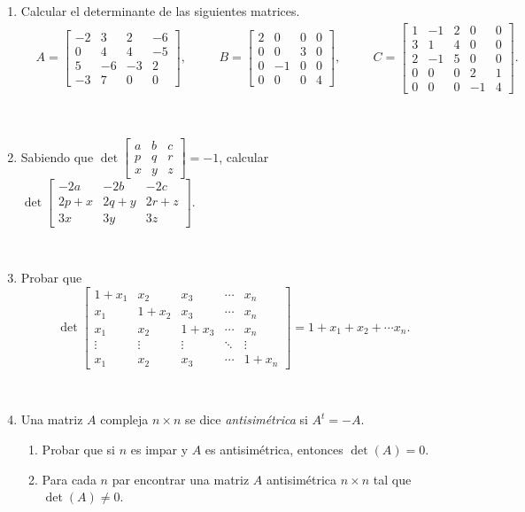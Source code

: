 \documentclass[11pt,spanish,makeidx]{amsbook}
\begin{document}
\begin{enumerate}


		\item Calcular el determinante de las siguientes matrices.
		\begin{align*}
		&A=\begin{bmatrix} -2&3&2&-6\\ 0&4&4&-5\\ 5&-6&-3&2\\ -3&7&0&0 \end{bmatrix},\quad
		&&B=\begin{bmatrix} 2&0&0&0\\ 0&0&3&0\\ 0&-1&0&0\\ 0&0&0&4\end{bmatrix},\quad
		&&C=\begin{bmatrix}
		1&-1&2&0&0\\ 3&1&4&0&0\\ 2&-1&5&0&0 \\0&0&0&2&1\\ 0&0&0&-1&4
		\end{bmatrix}.
		\end{align*}
	
\ 		
		
		\item Sabiendo que
		$
		\det \begin{bmatrix} a&b&c\\ p&q&r\\
		x&y&z\end{bmatrix}=-1
		$,
		calcular
		$
		\det \begin{bmatrix} -2a&-2b&-2c\\ 2p+x&2q+y&2r+z\\
		3x&3y&3z\end{bmatrix}.
		$
	
\ 	
		
		\item
		Probar que
		$$
		\det\begin{bmatrix}
		1+x_1 & x_2 & x_3 & \cdots & x_n \\
		x_1 & 1+x_2 & x_3 & \cdots & x_n \\
		x_1 & x_2 & 1+x_3 & \cdots & x_n \\
		\vdots & \vdots & \vdots &\ddots& \vdots \\
		x_1 & x_2 & x_3 & \cdots & 1+x_n
		\end{bmatrix}
		= 1+x_1+x_2 + \cdots x_n.
		$$
	
\ 
	
		\item
		Una matriz $A$ compleja $n \times n$ se dice {\it antisim\'etrica}
		si $A^t=-A$.
		\begin{enumerate}
			\item Probar que si $n$ es impar y $A$ es antisim\'etrica, entonces
			$\det(A)=0$.
			\item Para cada $n$ par encontrar una matriz $A$ antisim\'etrica
			$n \times n$ tal que $\det(A)\not=0$.
		\end{enumerate}
		
	
	
\end{enumerate}
\end{document}
